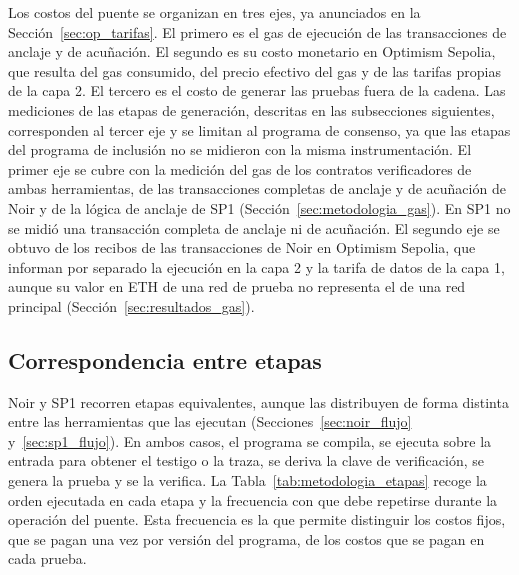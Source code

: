 Los costos del puente se organizan en tres ejes, ya anunciados en la
Sección~\ref{sec:op_tarifas}. El primero es el gas de ejecución de las transacciones de anclaje y
de acuñación. El segundo es su costo monetario en Optimism Sepolia, que resulta del gas consumido,
del precio efectivo del gas y de las tarifas propias de la capa 2. El tercero es el costo de generar
las pruebas fuera de la cadena. Las mediciones de las etapas de generación, descritas en las
subsecciones siguientes, corresponden al tercer eje y se limitan al programa de consenso, ya que
las etapas del programa de inclusión no se midieron con la misma instrumentación. El primer eje se
cubre con la medición del gas de los contratos verificadores de ambas herramientas, de las
transacciones completas de anclaje y de acuñación de Noir y de la lógica de anclaje de SP1
(Sección~\ref{sec:metodologia_gas}). En SP1 no se midió una transacción completa de anclaje ni de
acuñación. El segundo eje se obtuvo de los recibos de las transacciones de Noir en Optimism
Sepolia, que informan por separado la ejecución en la capa 2 y la tarifa de datos de la capa 1,
aunque su valor en ETH de una red de prueba no representa el de una red principal
(Sección~\ref{sec:resultados_gas}).

\subsection{Correspondencia entre etapas}
\label{sec:metodologia_etapas}

Noir y SP1 recorren etapas equivalentes, aunque las distribuyen de forma distinta entre las
herramientas que las ejecutan (Secciones~\ref{sec:noir_flujo} y~\ref{sec:sp1_flujo}). En ambos
casos, el programa se compila, se ejecuta sobre la entrada para obtener el testigo o la traza, se
deriva la clave de verificación, se genera la prueba y se la verifica. La
Tabla~\ref{tab:metodologia_etapas} recoge la orden ejecutada en cada etapa y la frecuencia con que
debe repetirse durante la operación del puente. Esta frecuencia es la que permite distinguir los
costos fijos, que se pagan una vez por versión del programa, de los costos que se pagan en cada
prueba.

